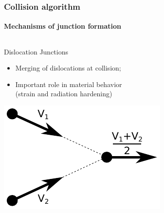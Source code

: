 \documentclass[aspectratio=1610,t,10pt]{beamer}
\newlength{\freeheight}
\begin{document}
\begin{frame}
\frametitle{Collision algorithm}
\framesubtitle{Mechanisms of junction formation}
\begin{columns}[c]
	\begin{column}{.48\textwidth}
		\begin{block}{Dislocation Junctions}
			\begin{itemize}
				\item Merging of dislocations at collision;
				\item Important role in material behavior \\ (strain and radiation hardening)
			\end{itemize}
		\end{block}
		\vspace{1em}
		\centering
		\includegraphics[height=0.25\freeheight]{img/collision_topo_poinpoint}
		

\end{column}
\end{columns}
\end{frame}
\end{document}
